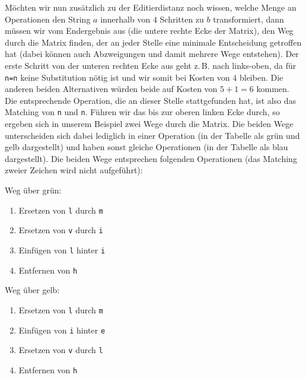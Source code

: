 \documentclass{whswinvcbook}
\begin{document}
Möchten wir nun zusätzlich zu der Editierdistanz noch wissen, welche Menge an Operationen den String $a$ innerhalb von $4$ Schritten zu $b$ transformiert, dann müssen wir vom Endergebnis aus (die untere rechte Ecke der Matrix), den Weg durch die Matrix finden, der an jeder Stelle eine minimale Entscheidung getroffen hat (dabei können auch Abzweigungen und damit mehrere Wege entstehen). Der erste Schritt von der unteren rechten Ecke aus geht z.\,B. nach links-oben, da für \texttt{n=n} keine Substitution nötig ist und wir somit bei Kosten von $4$ bleiben. Die anderen beiden Alternativen würden beide auf Kosten von $5+1=6$ kommen. Die entsprechende Operation, die an dieser Stelle stattgefunden hat, ist also das Matching von \texttt{n} und \texttt{n}. Führen wir das bis zur oberen linken Ecke durch, so ergeben sich in unserem Beispiel zwei Wege durch die Matrix. Die beiden Wege unterscheiden sich dabei lediglich in einer Operation (in der Tabelle als grün und gelb dargestellt) und haben sonst gleiche Operationen (in der Tabelle als blau dargestellt). Die beiden Wege entsprechen folgenden Operationen (das Matching zweier Zeichen wird nicht aufgeführt):
\begin{varwidth}[t]{.5\textwidth}
    Weg über grün:
    \begin{enumerate}
        \item Ersetzen von \texttt{l} durch \texttt{m}
        \item Ersetzen von \texttt{v} durch \texttt{i}
        \item Einfügen von \texttt{l} hinter \texttt{i}
        \item Entfernen von \texttt{h}
    \end{enumerate}
\end{varwidth}
\begin{varwidth}[t]{.5\textwidth}
    Weg über gelb:
    \begin{enumerate}
        \item Ersetzen von \texttt{l} durch \texttt{m}
        \item Einfügen von \texttt{i} hinter \texttt{e}
        \item Ersetzen von \texttt{v} durch \texttt{l}
        \item Entfernen von \texttt{h}
    \end{enumerate}
\end{varwidth}
\end{document}
